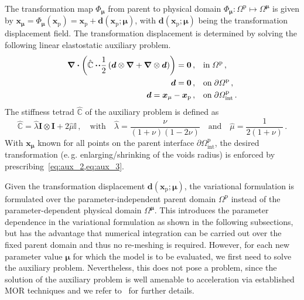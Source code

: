 \documentclass[a4paper]{eccomas_paper-2024}
\makeatletter
\newcommand{\eg}{e.\,g.\@\xspace}
\makeatother
\begin{document}
The transformation map $\Phi_{\bm\mu}$ from parent to physical domain $\Phi_{\bm\mu}: \varOmega^{\mathrm{p}}\mapsto\varOmega^{\bm\mu}$ is given by $\bm{x}_{\bm\mu}=\Phi_{\bm\mu}(\bm{x}_{\mathrm{p}}) = \bm{x}_{\mathrm{p}} + \bm{d}(\bm{x}_{\mathrm{p}}; \bm\mu)$, 
with $\bm{d}(\bm{x}_{\mathrm{p}}; \bm{\mu})$ being the transformation displacement field.
The transformation displacement is determined by solving the following linear elastostatic auxiliary problem.
\begin{align}
    \label{eq:aux_1}\div{\left(\hat{\mathbb{C}}\vdot\!\vdot\frac{1}{2}\left(
            \bm{d}\otimes\grad + \grad\otimes\bm{d}
\right)\right)}
            = \bm{0}\,,\quad&\mathrm{in}\;\varOmega^{\mathrm{p}}\,,\\
    \label{eq:aux_2}\bm{d} = \bm{0}\,,\quad&\mathrm{on}\;\partial\varOmega^{\mathrm{p}}\,,\\
    \label{eq:aux_3}\bm{d} = \bm{x}_{\mu} - \bm{x}_{\mathrm{p}}\,,\quad&\mathrm{on}\;\partial\varOmega^{\mathrm{p}}_{\mathrm{int}}\,.
\end{align}
The stiffness tetrad $\hat{\mathbb{C}}$ of the auxiliary problem is defined as
\begin{equation}
    \hat{\mathbb{C}} = \hat{\lambda} \bm{I}\otimes\bm{I} + 2\hat{\mu}\mathbb{I}\,,\quad\mathrm{with}\quad \hat{\lambda}=\frac{\nu}{(1+\nu)(1-2\nu)}\quad\mathrm{and}\quad\hat{\mu}=\frac{1}{2(1+\nu)}\,.
    \label{eq:aux_tetrad}
\end{equation}
With $\bm{x}_{\bm\mu}$ known for all points on the parent interface $\partial\varOmega^{\mathrm{p}}_{\mathrm{int}}$, the desired transformation (\eg{} enlarging/shrinking of the voids radius) is enforced by prescribing~\cref{eq:aux_2,eq:aux_3}.

Given the transformation displacement $\bm{d}(\bm{x}_{\mathrm{p}};\bm\mu)$, the variational formulation is formulated over the parameter-independent parent domain $\varOmega^{\mathrm{p}}$ instead of the parameter-dependent physical domain $\varOmega^{\bm\mu}$.
This introduces the parameter dependence in the variational formulation as shown in the following subsections, but has the advantage that numerical integration can be carried out over the fixed parent domain and thus no re-meshing is required.
However, for each new parameter value $\bm\mu$ for which the model is to be evaluated, we first need to solve the auxiliary problem.
Nevertheless, this does not pose a problem, since the solution of the auxiliary problem is well amenable to acceleration via established MOR techniques and we refer to~\cite{Guo2022Learning} for further details.
\end{document}
